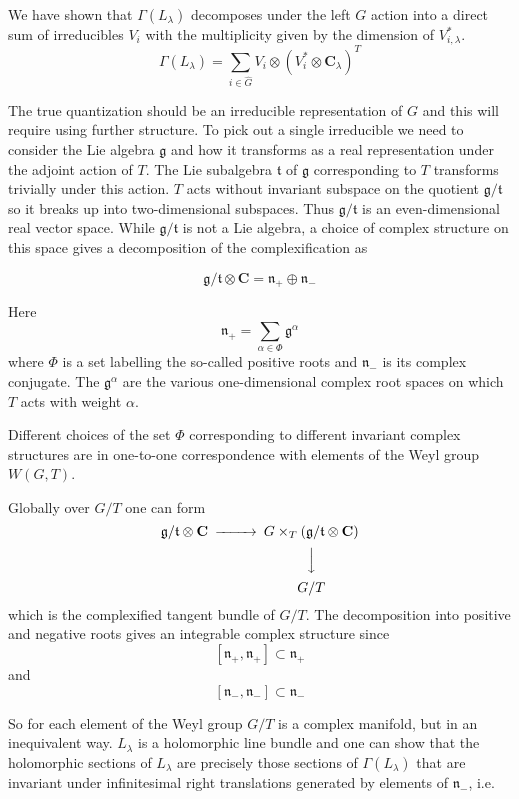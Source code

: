 \documentclass[a4paper,a4paper]{article}
\theoremstyle{conjecture}
\begin{document}
We have shown that $\Gamma(L_\lambda)$ decomposes under the left $G$
action into a direct sum of irreducibles $V_i$ with the
multiplicity given by the dimension of $V_{i,\lambda}^*$.
$$\Gamma(L_\lambda)=\sum_{i\in \hat G}V_i\otimes (V_i^*\otimes \mathbf C_\lambda)^T$$

The true
quantization should be an irreducible representation of $G$ and
this will require using further structure.
To pick out a single irreducible we need to consider the Lie
algebra $\mathfrak g$ and how it transforms as a real
representation under the adjoint action of $T$. The Lie subalgebra
$\mathfrak t$ of $\mathfrak g$ corresponding to $T$ transforms
trivially under this action. $T$ acts without invariant subspace
on the quotient ${\mathfrak g}/{\mathfrak t}$ so it breaks up into
two-dimensional subspaces.  Thus ${\mathfrak g}/{\mathfrak t}$ is
an even-dimensional real vector space.  While ${\mathfrak
g}/{\mathfrak t}$ is not a Lie algebra, a choice of complex
structure on this space gives a decomposition of the
complexification as

$$ {\mathfrak g}/{\mathfrak t}\otimes{\mathbf C}={\mathfrak n}_+
\oplus {\mathfrak n}_-$$

Here
$${\mathfrak n}_+=\sum_{\alpha\in \Phi} {\mathfrak g}^\alpha$$ where $\Phi$ is a set
labelling the so-called positive roots and ${\mathfrak n}_-$ is
its complex conjugate. The ${\mathfrak g}^\alpha$ are the various
one-dimensional complex root spaces on which $T$ acts with weight
$\alpha$.

Different choices of the set $\Phi$ corresponding to different
invariant complex structures are in one-to-one correspondence with
elements of the Weyl group $W(G,T)$.

Globally over $G/T$ one can form
\begin{equation*}
\begin{CD}
{\mathfrak g}/{\mathfrak t}\otimes{\mathbf C}@>>>G\times_T ({\mathfrak g}/{\mathfrak t}\otimes{\mathbf C})\\
@. @VVV\\
{} @. G/T
\end{CD}
\end{equation*}
which is the complexified tangent bundle of $G/T$.  The
decomposition into positive and negative roots gives an integrable
complex structure since
$$[{\mathfrak n}_+,{\mathfrak n}_+]\subset {\mathfrak n}_+$$
and
$$[{\mathfrak n}_-,{\mathfrak n}_-]\subset {\mathfrak n}_-$$

So for each element of the Weyl group $G/T$ is a complex manifold,
but in an inequivalent way.  $L_\lambda$ is a holomorphic line bundle
and one can show that the holomorphic sections of $L_\lambda$ are precisely
those sections of $\Gamma(L_\lambda)$ that are invariant under infinitesimal
right translations generated by elements of $\mathfrak n_-$, i.e.
\end{document}
